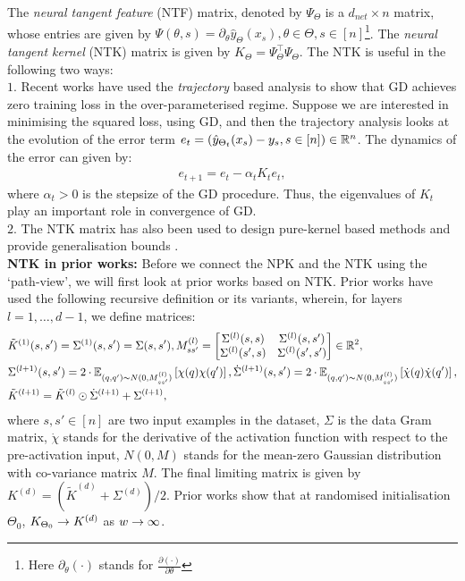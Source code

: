 The \emph{neural tangent feature} (NTF) matrix, denoted by $\Psi_{\Theta}$ is a $d_{net}\times n$ matrix, whose entries are given by $\Psi(\theta,s)=\partial_{\theta} \hat{y}_{\Theta}(x_s),\theta\in\Theta, s\in[n]$\footnote{Here $\partial_{\theta}(\cdot)$ stands for $\frac{\partial (\cdot)}{\partial \theta}$}. The \emph{neural tangent kernel} (NTK) matrix is given by $K_{\Theta}=\Psi_{\Theta}^\top\Psi_{\Theta}$. The NTK is useful in the following two ways:\\
$1.$ Recent works have used the \emph{trajectory} based analysis to show that GD achieves zero training loss in the over-parameterised regime. Suppose we are interested in minimising the squared loss, using GD, and then the trajectory analysis looks at the evolution of the error term $e_t=(\hat{y}_{\Theta_t}(x_s)-y_s,s\in[n])\in\mathbb{R}^n$. The dynamics of the error can given by:
\begin{align}
e_{t+1}=e_t-\alpha_t K_t e_t,
\end{align}
where $\alpha_t>0$ is the stepsize of the GD procedure. Thus, the eigenvalues of $K_t$ play an important role in convergence of GD.\\
$2.$ The NTK matrix has also been used to design pure-kernel based methods \cite{arora2019exact} and provide generalisation bounds \cite{cao2019generalization}.\\
\textbf{NTK in prior works:} Before we connect the NPK and the NTK using the `path-view', we will first look at prior works based on NTK. Prior works have used the following recursive definition or its variants, wherein, for layers $l=1,\ldots, d-1$, we define matrices:
\begin{align}\label{eq:ntkold}
&\tilde{K}^{(1)}(s,s')=\Sigma^{(1)}(s,s')=\Sigma(s,s'), M^{(l)}_{ss'}=\left[\begin{matrix}\Sigma^{(l)}(s,s) & \Sigma^{(l)}(s,s')\\ \Sigma^{(l)}(s',s) & \Sigma^{(l)}(s',s')\end{matrix}\right]\in \mathbb{R}^2,\\
&\Sigma^{(l+1)}(s,s')= 2\cdot\mathbb{E}_{(q,q')\sim N(0,M_{ss'}^{(l)})} \left[\chi(q)\chi(q')\right], \dot{\Sigma}^{(l+1)}(s,s')= 2\cdot\mathbb{E}_{(q,q')\sim N(0,M_{ss'}^{(l)})}\left[\dot{\chi}(q)\dot{\chi}(q')\right],\nonumber\\
&\tilde{K}^{(l+1)}=\tilde{K}^{(l)}\odot \dot{\Sigma}^{(l+1)}+\Sigma^{(l+1)},\nonumber
\end{align}
where $s,s'\in[n]$ are two input examples in the dataset, $\Sigma$ is the data Gram matrix, $\dot{\chi}$ stands for the derivative of the activation function with respect to the pre-activation input, $N(0,M)$ stands for the mean-zero Gaussian distribution with co-variance matrix $M$. The final limiting matrix is given by $K^{(d)}=\left(\tilde{K}^{(d)}+\Sigma^{(d)}\right)/2$. Prior works show that at randomised initialisation $\Theta_0$, $K_{\Theta_0}\rightarrow K^{(d)}$ as $w\rightarrow \infty$.\\
